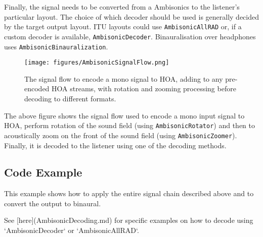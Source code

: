 \documentclass[12pt]{report}
\newcommand{\code}[1]{\texttt{#1}}
\begin{document}
Finally, the signal needs to be converted from a Ambisonics to the listener's particular layout. The choice of which decoder should be used is generally decided by the target output layout. ITU layouts could use \code{AmbisonicAllRAD} or, if a custom decoder is available, \code{AmbisonicDecoder}. Binauralisation over headphones uses \code{AmbisonicBinauralization}.

\begin{figure}
    \centering
    \texttt{[image: figures/AmbisonicSignalFlow.png]}
    \caption{The signal flow to encode a mono signal to HOA, adding to any pre-encoded HOA streams, with rotation and zooming processing before decoding to different formats.}
    \label{fig:ambi_signal_flow}
\end{figure}

The above figure shows the signal flow used to encode a mono input signal to HOA, perform rotation of the sound field (using \code{AmbisonicRotator}) and then to acoustically zoom on the front of the sound field (using \code{AmbisonicZoomer}).
Finally, it is decoded to the listener using one of the decoding methods.

\subsection{Code Example}

This example shows how to apply the entire signal chain described above and to convert the output to binaural.

See [here](AmbisonicDecoding.md) for specific examples on how to decode using `AmbisonicDecoder` or `AmbisonicAllRAD`.
\end{document}
